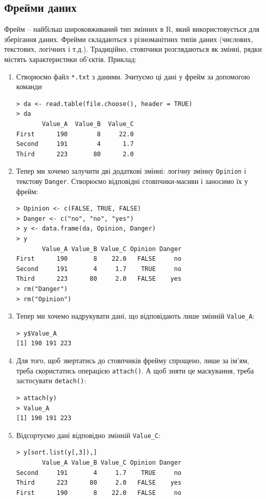 \documentclass[a4paper, 12pt]{article}
\begin{document}
\subsection{Фрейми даних}

Фрейм -- найбільш широковживаний тип змінних в R, який використовується для зберігання даних. Фрейми складаються з різноманітних типів даних (числових, текстових, логічних і т.д.). Традиційно, стовпчики розглядаються як змінні, рядки містять характеристики об’єктів. Приклад:

\begin{enumerate}
\item Створюємо файл \verb|*.txt| з даними. Зчитуємо ці дані у фрейм за допомогою команди

\begin{verbatim}
> da <- read.table(file.choose(), header = TRUE)
> da
       Value_A  Value_B  Value_C
First      190        8     22.0
Second     191        4      1.7
Third      223       80      2.0
\end{verbatim}

\item Тепер ми хочемо залучити дві додаткові змінні: логічну змінну \verb|Opinion| і текстову \verb|Danger|. Створюємо відповідні стовпчики-масиви і заносимо їх у фрейм:

\begin{verbatim}
> Opinion <- c(FALSE, TRUE, FALSE)
> Danger <- c("no", "no", "yes")
> y <- data.frame(da, Opinion, Danger)
> y
       Value_A Value_B Value_C Opinion Danger
First      190       8    22.0   FALSE     no
Second     191       4     1.7    TRUE     no
Third      223      80     2.0   FALSE    yes
> rm("Danger")
> rm("Opinion")
\end{verbatim}

\item Тепер ми хочемо надрукувати дані, що відповідають лише змінній \verb|Value_A|:

\begin{verbatim}
> y$Value_A
[1] 190 191 223
\end{verbatim}

\item Для того, щоб звертатись до стовпчиків фрейму спрощено, лише за ім’ям, треба скористатись операцією \verb|attach()|. А щоб зняти це маскування, треба застосувати \verb|detach()|:

\begin{verbatim}
> attach(y)
> Value_A
[1] 190 191 223
\end{verbatim}

\item Відсортуємо дані відповідно змінній \verb|Value_C|:

\begin{verbatim}
> y[sort.list(y[,3]),]
       Value_A Value_B Value_C Opinion Danger
Second     191       4     1.7    TRUE     no
Third      223      80     2.0   FALSE    yes
First      190       8    22.0   FALSE     no
\end{verbatim}

\end{enumerate}
\end{document}
